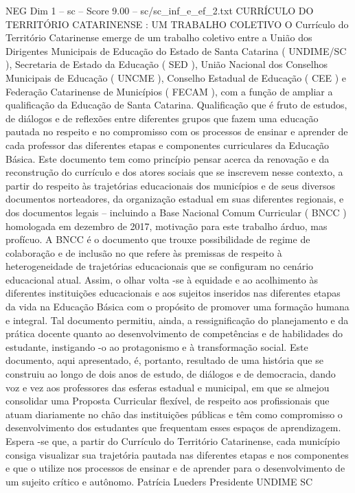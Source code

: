 \begin{textsample}{NEG Dim 1 – sc – Score 9.00 – sc/sc\_inf\_e\_ef\_2.txt}  \label{ex:f1_neg_277}
CURRÍCULO DO TERRITÓRIO CATARINENSE : UM TRABALHO COLETIVO O Currículo do Território Catarinense emerge de um trabalho coletivo entre a União dos Dirigentes Municipais de Educação do Estado de Santa Catarina ( UNDIME/SC ), Secretaria de Estado da Educação ( SED ), União Nacional dos Conselhos Municipais de Educação ( UNCME ), Conselho Estadual de Educação ( CEE ) e Federação Catarinense de Municípios ( FECAM ), com a função de ampliar a qualificação da Educação de Santa Catarina.
Qualificação que é fruto de estudos, de diálogos e de reflexões entre diferentes grupos que fazem uma educação pautada no respeito e no compromisso com os processos de ensinar e aprender de cada professor das diferentes etapas e componentes curriculares da Educação Básica.
Este documento tem como princípio pensar acerca da renovação e da reconstrução do currículo e dos atores sociais que se inscrevem nesse contexto, a partir do respeito às trajetórias educacionais dos municípios e de seus diversos documentos norteadores, da organização estadual em suas diferentes regionais, e dos documentos legais – incluindo a Base Nacional Comum Curricular ( BNCC ) homologada em dezembro de 2017, motivação para este trabalho árduo, mas profícuo.
A BNCC é o documento que trouxe possibilidade de regime de colaboração e de inclusão no que refere às premissas de respeito à heterogeneidade de trajetórias educacionais que se configuram no cenário educacional atual.
Assim, o olhar volta -se à equidade e ao acolhimento às diferentes instituições educacionais e aos sujeitos inseridos nas diferentes etapas da vida na Educação Básica com o propósito de promover uma formação humana e integral.
Tal documento permitiu, ainda, a ressignificação do planejamento e da prática docente quanto ao desenvolvimento de competências e de habilidades do estudante, instigando -o ao protagonismo e à transformação social.
Este documento, aqui apresentado, é, portanto, resultado de uma história que se construiu ao longo de dois anos de estudo, de diálogos e de democracia, dando voz e vez aos professores das esferas estadual e municipal, em que se almejou consolidar uma Proposta Curricular flexível, de respeito aos profissionais que atuam diariamente no chão das instituições públicas e têm como compromisso o desenvolvimento dos estudantes que frequentam esses espaços de aprendizagem.
Espera -se que, a partir do Currículo do Território Catarinense, cada município consiga visualizar sua trajetória pautada nas diferentes etapas e nos componentes e que o utilize nos processos de ensinar e de aprender para o desenvolvimento de um sujeito crítico e autônomo.
Patrícia Lueders Presidente UNDIME SC

\end{textsample}
